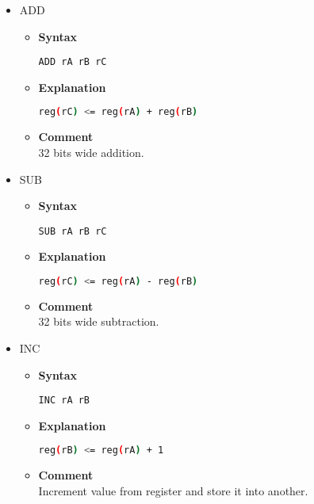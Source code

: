 \begin{itemize}
    \item ADD
    \begin{itemize}
        \item \textbf{Syntax}
        \begin{lstlisting}[language={[markII]Assembler}, frame=single]
    ADD rA rB rC
        \end{lstlisting}
        \item \textbf{Explanation}
        \begin{lstlisting}[language=bash, frame=single]
    reg(rC) <= reg(rA) + reg(rB)
        \end{lstlisting}
        \item \textbf{Comment} \\
    32 bits wide addition.
    \end{itemize}

    \item SUB
    \begin{itemize}
        \item \textbf{Syntax}
        \begin{lstlisting}[language={[markII]Assembler}, frame=single]
    SUB rA rB rC
        \end{lstlisting}
        \item \textbf{Explanation}
        \begin{lstlisting}[language=bash, frame=single]
    reg(rC) <= reg(rA) - reg(rB)
        \end{lstlisting}
        \item \textbf{Comment} \\
    32 bits wide subtraction.
    \end{itemize}

    \item INC
    \begin{itemize}
        \item \textbf{Syntax}
        \begin{lstlisting}[language={[markII]Assembler}, frame=single]
    INC rA rB
        \end{lstlisting}
        \item \textbf{Explanation}
        \begin{lstlisting}[language=bash, frame=single]
    reg(rB) <= reg(rA) + 1
        \end{lstlisting}
        \item \textbf{Comment} \\
    Increment value from register and store it into another.
    \end{itemize}


\end{itemize}
